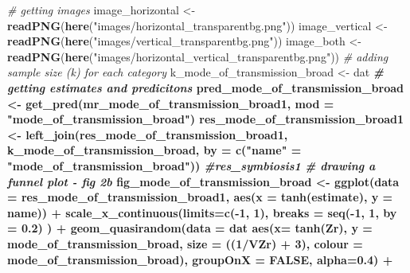 \documentclass[
]{article}
\newenvironment{Shaded}{\begin{snugshade}}{\end{snugshade}}
\newcommand{\CommentTok}[1]{\textcolor[rgb]{0.56,0.35,0.01}{\textit{#1}}}
\newcommand{\DataTypeTok}[1]{\textcolor[rgb]{0.13,0.29,0.53}{#1}}
\newcommand{\DecValTok}[1]{\textcolor[rgb]{0.00,0.00,0.81}{#1}}
\newcommand{\FloatTok}[1]{\textcolor[rgb]{0.00,0.00,0.81}{#1}}
\newcommand{\KeywordTok}[1]{\textcolor[rgb]{0.13,0.29,0.53}{\textbf{#1}}}
\newcommand{\NormalTok}[1]{#1}
\newcommand{\OperatorTok}[1]{\textcolor[rgb]{0.81,0.36,0.00}{\textbf{#1}}}
\newcommand{\OtherTok}[1]{\textcolor[rgb]{0.56,0.35,0.01}{#1}}
\newcommand{\StringTok}[1]{\textcolor[rgb]{0.31,0.60,0.02}{#1}}
\begin{document}
\begin{Shaded}
\begin{Highlighting}[]
\CommentTok{# getting images}
\NormalTok{image_horizontal <-}\StringTok{ }\KeywordTok{readPNG}\NormalTok{(}\KeywordTok{here}\NormalTok{(}\StringTok{"images/horizontal_transparentbg.png"}\NormalTok{))}
\NormalTok{image_vertical <-}\StringTok{ }\KeywordTok{readPNG}\NormalTok{(}\KeywordTok{here}\NormalTok{(}\StringTok{"images/vertical_transparentbg.png"}\NormalTok{))}
\NormalTok{image_both <-}\StringTok{ }\KeywordTok{readPNG}\NormalTok{(}\KeywordTok{here}\NormalTok{(}\StringTok{"images/horizontal_vertical_transparentbg.png"}\NormalTok{))}
\CommentTok{# adding sample size (k) for each category}
\NormalTok{k_mode_of_transmission_broad <-}\StringTok{ }\NormalTok{dat }\OperatorTok{%
\CommentTok{# getting estimates and predicitons}
\NormalTok{pred_mode_of_transmission_broad <-}\StringTok{ }\KeywordTok{get_pred}\NormalTok{(mr_mode_of_transmission_broad1, }\DataTypeTok{mod =} \StringTok{"mode_of_transmission_broad"}\NormalTok{) }
\NormalTok{res_mode_of_transmission_broad1 <-}\StringTok{ }\KeywordTok{left_join}\NormalTok{(res_mode_of_transmission_broad1, k_mode_of_transmission_broad, }\DataTypeTok{by =}  \KeywordTok{c}\NormalTok{(}\StringTok{"name"}\NormalTok{ =}\StringTok{ "mode_of_transmission_broad"}\NormalTok{))  }\OperatorTok{%
\CommentTok{#res_symbiosis1 }
\CommentTok{# drawing a funnel plot - fig 2b}
\NormalTok{fig_mode_of_transmission_broad <-}\StringTok{ }\KeywordTok{ggplot}\NormalTok{(}\DataTypeTok{data =}\NormalTok{ res_mode_of_transmission_broad1, }\KeywordTok{aes}\NormalTok{(}\DataTypeTok{x =} \KeywordTok{tanh}\NormalTok{(estimate), }\DataTypeTok{y =}\NormalTok{ name)) }\OperatorTok{+}
\StringTok{  }\KeywordTok{scale_x_continuous}\NormalTok{(}\DataTypeTok{limits=}\KeywordTok{c}\NormalTok{(}\OperatorTok{-}\DecValTok{1}\NormalTok{, }\DecValTok{1}\NormalTok{), }\DataTypeTok{breaks =} \KeywordTok{seq}\NormalTok{(}\OperatorTok{-}\DecValTok{1}\NormalTok{, }\DecValTok{1}\NormalTok{, }\DataTypeTok{by =} \FloatTok{0.2}\NormalTok{) ) }\OperatorTok{+}
\StringTok{  }\KeywordTok{geom_quasirandom}\NormalTok{(}\DataTypeTok{data =}\NormalTok{ dat }\OperatorTok{%
                   \KeywordTok{aes}\NormalTok{(}\DataTypeTok{x=} \KeywordTok{tanh}\NormalTok{(Zr), }\DataTypeTok{y =}\NormalTok{ mode_of_transmission_broad, }\DataTypeTok{size =}\NormalTok{ ((}\DecValTok{1}\OperatorTok{/}\NormalTok{VZr) }\OperatorTok{+}\StringTok{ }\DecValTok{3}\NormalTok{), }\DataTypeTok{colour =}\NormalTok{ mode_of_transmission_broad), }\DataTypeTok{groupOnX =} \OtherTok{FALSE}\NormalTok{, }\DataTypeTok{alpha=}\FloatTok{0.4}\NormalTok{) }\OperatorTok{+}\StringTok{ }
}}}
\end{Highlighting}
\end{Shaded}
\end{document}

